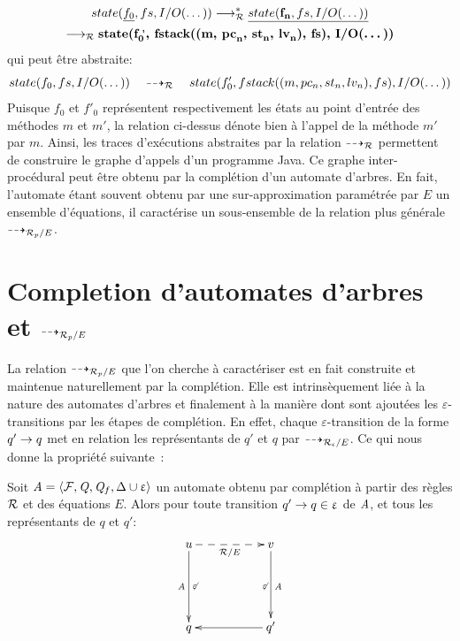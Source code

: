 \textit{
  \begin{multline*}
    state(\underline{f_0}, fs, I/O(\dots)) \longrightarrow_\mathcal R^* \underline{state(\textbf{f}_\textbf{n}, {fs}, I/O(\dots))} \\
    \longrightarrow_\mathcal R \textbf{state(f}_\textbf{0}^\textbf{\ ,}\textbf{, fstack((m, pc}_\textbf{n}\textbf{, st}_\textbf{n}\textbf{, lv}_\textbf{n}\textbf{), fs), I/O(\dots))}
  \end{multline*}
}
\noindent qui peut être abstraite:
\textit{
\[ state(f_0, fs, I/O(\dots)) \quad \dashrightarrow_\mathcal R \quad state(f'_0, fstack((m, pc_n, st_n, lv_n), fs), I/O(\dots)) \]
}
Puisque $f_0$ et $f'_0$ représentent respectivement les états au point d'entrée des méthodes $m$ et $m'$, la relation ci-dessus
dénote bien à l'appel de la méthode $m'$ par $m$. Ainsi, les traces d'exécutions abstraites par la relation $\dashrightarrow_\mathcal R$
permettent de construire le graphe d'appels d'un programme Java.
Ce graphe inter-procédural peut être obtenu par la complétion d'un automate d'arbres.
En fait, l'automate étant souvent obtenu par une sur-approximation paramétrée par $E$ un ensemble d'équations, il caractérise 
un sous-ensemble de la relation plus générale $\dashrightarrow_{\mathcal R_p/E}$. 

\section{Completion d'automates d'arbres et $\dashrightarrow_{\mathcal R_p/E}$}

La relation $\dashrightarrow_{\mathcal R_p/E}$ que l'on cherche à caractériser est en fait construite
et maintenue naturellement par la complétion. Elle est intrinsèquement liée à la nature
des automates d'arbres et finalement à la manière dont sont ajoutées les  $\varepsilon$-transitions 
par les étapes de complétion. En effet, chaque $\varepsilon$-transition de la forme $q' \rightarrow q$
met en relation les représentants de $q'$ et $q$ par $\dashrightarrow_{\mathcal R_\epsilon/E}$.
Ce qui nous donne la propriété suivante~:

\begin{lemma}
  \label{lem:completion_arw}
  Soit $\mathit A = \langle \mathcal{F}, \mathit Q, \mathit Q_f, \Delta \cup \upvarepsilon\rangle$ un automate obtenu 
  par complétion à partir des règles $\mathcal R$ et des équations $E$.
  Alors pour toute transition $q' \rightarrow q \in \upvarepsilon$ de $\mathit A$,
  et tous les représentants de $q$ et $q'$:
  \[
  \xymatrix{
    u \ar[dd]_{\A}^{\not\varepsilon} \ar@{-->} [rr]_{\R/E} && v \ar[dd]^{\A}_{\not\varepsilon}\\
    &&\\
    q && q' \ar[ll]
  }
  \]
  
  \end{lemma}

